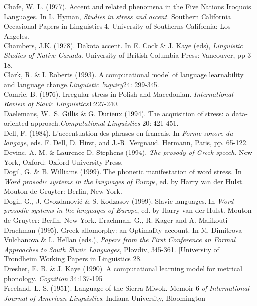 \documentclass[a4paper]{article}
\begin{document}
Chafe, W. L. (1977). Accent and related phenomena in the Five Nations Iroquois Languages. In L. Hyman, \textit{Studies in stress and accent}. Southern California Occasional Papers in Linguistics 4. University of Southerns California: Los Angeles.\\\noindent
Chambers, J.K. (1978). Dakota accent. In E. Cook \& J. Kaye (eds), \textit{Linguistic Studies of Native Canada}. University of British Columbia Press: Vancouver, pp 3-18.\\\noindent
Clark, R. \& I. Roberts (1993). A computational model of language learnability and language change.\textit{Linguistic Inquiry}24: 299-345.\\\noindent
Comrie, B. (1976). Irregular stress in Polish and Macedonian. \textit{International Review of Slavic Linguistics}1:227-240.\\\noindent
Daelemans,  W., S. Gillis \& G. Durieux (1994). The acquisition of stress: a data-oriented approach.\textit{Computational Linguistics} 20: 421-451.\\\noindent
Dell, F. (1984). L’accentuation des phrases en francais. In \textit{Forme sonore du langage}, eds. F. Dell, D. Hirst, and J.-R. Vergnaud. Hermann, Paris, pp. 65-122.\\\noindent
Devine, A. M. \& Laurence D. Stephens (1994). \textit{The prosody of Greek speech}. New York, Oxford: Oxford University Press.\\\noindent
Dogil, G. \& B. Williams (1999). The phonetic manifestation of word stress. In \textit{Word prosodic systems in the languages of Europe}, ed. by Harry van der Hulst. Mouton de Gruyter: Berlin, New York.\\\noindent
Dogil, G., J. Gvozdanović \& S. Kodzasov (1999). Slavic languages. In \textit{Word prosodic systems in the languages of Europe}, ed. by Harry van der Hulst. Mouton de Gruyter: Berlin, New York.
Drachman, G., R. Kager and A. Malikouti-Drachman (1995). Greek allomorphy: an Optimality account. In M. Dimitrova-Vulchanova \& L. Hellan (eds.), \textit{Papers from the First Conference on Formal Approaches to South Slavic Languages}, Plovdiv, 345-361. [University of Trondheim Working Papers in Linguistics 28.]\\\noindent
Dresher, E.  B. \& J. Kaye (1990). A computational learning model for metrical phonology. \textit{Cognition} 34:137-195.\\\noindent
Freeland, L. S. (1951). Language of the Sierra Miwok. Memoir 6 \textit{of International Journal of American Linguistics}. Indiana University, Bloomington.\\\noindent
\end{document}
